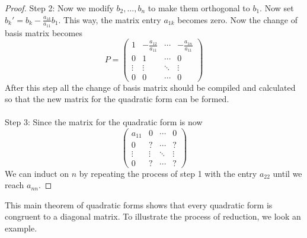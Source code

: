 \begin{thm}{}{}
\begin{proof}
Step 2: Now we modify $b_2,\dots,b_n$ to make them orthogonal to $b_1$. Now set $b_k'=b_k-\frac{a_{1k}}{a_{11}}b_1$. This way, the matrix entry $a_{1k}$ becomes zero. Now the change of basis matrix becomes $$P=\begin{pmatrix}
1 & -\frac{a_{12}}{a_{11}} & \cdots & -\frac{a_{1n}}{a_{11}}\\
0 & 1 & \cdots & 0\\
\vdots & \vdots & \ddots & \vdots\\
0 & 0 & \cdots & 0
\end{pmatrix}$$
After this step all the change of basis matrix should be compiled and calculated so that the new matrix for the quadratic form can be formed. \\~\\
Step 3: Since the matrix for the quadratic form is now $$\begin{pmatrix}
a_{11} & 0 & \cdots & 0\\
0 & ? & \cdots & ?\\
\vdots & \vdots & \ddots & \vdots\\
0 & ? & \cdots & ?
\end{pmatrix}$$
We can induct on $n$ by repeating the process of step 1 with the entry $a_{22}$ until we reach $a_{nn}$. 
\end{proof}
\end{thm}

This main theorem of quadratic forms shows that every quadratic form is congruent to a diagonal matrix. To illustrate the process of reduction, we look an example. 

